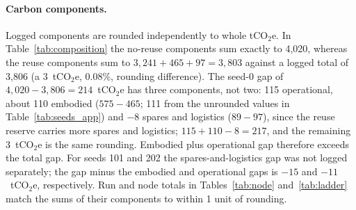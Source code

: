 \documentclass{article} %
\begin{document}
\paragraph{Carbon components.} Logged components are rounded independently to whole tCO$_2$e. In Table~\ref{tab:composition} the no-reuse components sum exactly to 4,020, whereas the reuse components sum to $3{,}241 + 465 + 97 = 3{,}803$ against a logged total of 3,806 (a 3~tCO$_2$e, 0.08\%, rounding difference). The seed-0 gap of $4{,}020 - 3{,}806 = 214$~tCO$_2$e has three components, not two: 115 operational, about 110 embodied ($575 - 465$; 111 from the unrounded values in Table~\ref{tab:seeds_app}) and $-8$ spares and logistics ($89 - 97$), since the reuse reserve carries more spares and logistics; $115 + 110 - 8 = 217$, and the remaining 3~tCO$_2$e is the same rounding. Embodied plus operational gap therefore exceeds the total gap. For seeds 101 and 202 the spares-and-logistics gap was not logged separately; the gap minus the embodied and operational gaps is $-15$ and $-11$~tCO$_2$e, respectively. Run and node totals in Tables~\ref{tab:node} and~\ref{tab:ladder} match the sums of their components to within 1 unit of rounding.

\begin{table}[h]
\caption{Node-level sensitivity: ten largest swings (mixed grid, LC, base 0.93\%).}
\label{tab:tornado_app}
\begin{center}
\small
{}
\end{center}
\end{table}
\end{document}
